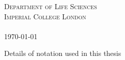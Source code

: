 \documentclass[a4paper]{article} %
\begin{document}
\begin{titlepage}
    \textsc{Department of Life Sciences \\ Imperial College London \\ \ }\\[1cm]
    \textsc{\today}\\[2cm] %
    
    \vfill %
    
\end{titlepage}
\begin{table}
    \caption{Details of notation used in this thesis}


\end{table}
\end{document}
